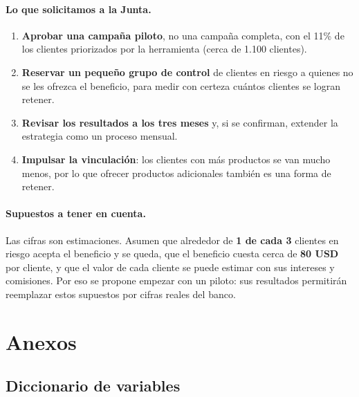 \documentclass[11pt,a4paper]{article}
\begin{document}
\paragraph{Lo que solicitamos a la Junta.}
\begin{enumerate}
  \item \textbf{Aprobar una campaña piloto}, no una campaña completa, con el 11\% de los clientes priorizados por la herramienta (cerca de 1.100 clientes).
  \item \textbf{Reservar un pequeño grupo de control} de clientes en riesgo a quienes no se les ofrezca el beneficio, para medir con certeza cuántos clientes se logran retener.
  \item \textbf{Revisar los resultados a los tres meses} y, si se confirman, extender la estrategia como un proceso mensual.
  \item \textbf{Impulsar la vinculación}: los clientes con más productos se van mucho menos, por lo que ofrecer productos adicionales también es una forma de retener.
\end{enumerate}

\paragraph{Supuestos a tener en cuenta.} Las cifras son estimaciones. Asumen que alrededor de \textbf{1 de cada 3} clientes en riesgo acepta el beneficio y se queda, que el beneficio cuesta cerca de \textbf{80 USD} por cliente, y que el valor de cada cliente se puede estimar con sus intereses y comisiones. Por eso se propone empezar con un piloto: sus resultados permitirán reemplazar estos supuestos por cifras reales del banco.

\appendix
\section{Anexos}

\subsection{Diccionario de variables}
\label{anx:diccionario}
\end{document}
